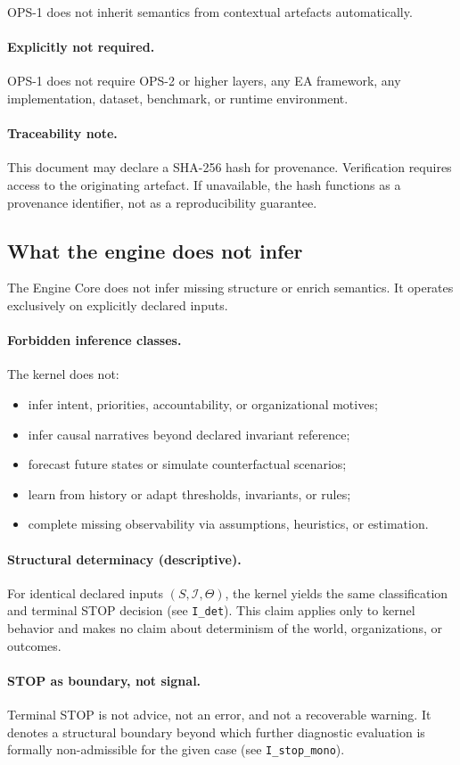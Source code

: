 OPS-1 does not inherit semantics from contextual artefacts automatically.

\paragraph{Explicitly not required.}
OPS-1 does not require OPS-2 or higher layers, any EA framework,
any implementation, dataset, benchmark, or runtime environment.

\paragraph{Traceability note.}
This document may declare a SHA-256 hash for provenance.
Verification requires access to the originating artefact.
If unavailable, the hash functions as a provenance identifier,
not as a reproducibility guarantee.

\subsection{What the engine does not infer}

The Engine Core does not infer missing structure or enrich semantics.
It operates exclusively on explicitly declared inputs.

\paragraph{Forbidden inference classes.}
The kernel does not:
\begin{itemize}
  \item infer intent, priorities, accountability, or organizational motives;
  \item infer causal narratives beyond declared invariant reference;
  \item forecast future states or simulate counterfactual scenarios;
  \item learn from history or adapt thresholds, invariants, or rules;
  \item complete missing observability via assumptions, heuristics, or estimation.
\end{itemize}

\paragraph{Structural determinacy (descriptive).}
For identical declared inputs $(S,\mathcal{I},\Theta)$,
the kernel yields the same classification and terminal STOP decision
(see \texttt{I\_det}).
This claim applies only to kernel behavior and makes no claim about
determinism of the world, organizations, or outcomes.

\paragraph{STOP as boundary, not signal.}
Terminal STOP is not advice, not an error,
and not a recoverable warning.
It denotes a structural boundary beyond which further diagnostic evaluation is
formally non-admissible for the given case
(see \texttt{I\_stop\_mono}).
